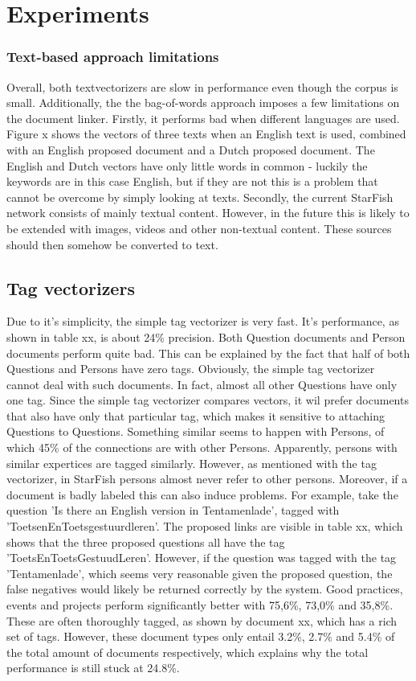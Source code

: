 \section{Experiments}
\subsubsection{Text-based approach limitations}
Overall, both textvectorizers are slow in performance even though the corpus is small. Additionally, the the bag-of-words approach imposes a few limitations on the document linker. Firstly, it performs bad when different languages are used. Figure x shows the vectors of three texts when an English text is used, combined with an English proposed document and a Dutch proposed document. The English and Dutch vectors have only little words in common - luckily the keywords are in this case English, but if they are not this is a problem that cannot be overcome by simply looking at texts. Secondly, the current StarFish network consists of mainly textual content. However, in the future this is likely to be extended with images, videos and other non-textual content. These sources should then somehow be converted to text.

\subsection{Tag vectorizers}

Due to it's simplicity, the simple tag vectorizer is very fast. It's performance, as shown in table xx, is about 24\% precision. Both Question documents and Person documents perform quite bad. This can be explained by the fact that half of both Questions and Persons have zero tags. Obviously, the simple tag vectorizer cannot deal with such documents. In fact, almost all other Questions have only one tag. Since the simple tag vectorizer compares vectors, it wil prefer documents that also have only that particular tag, which makes it sensitive to attaching Questions to Questions. Something similar seems to happen with Persons, of which 45\% of the connections are with other Persons. Apparently, persons with similar expertices are tagged similarly. However, as mentioned with the tag vectorizer, in StarFish persons almost never refer to other persons. Moreover, if a document is badly labeled this can also induce problems. For example, take the question 'Is there an English version in Tentamenlade', tagged with 'ToetsenEnToetsgestuurdleren'. The proposed links are visible in table xx, which shows that  the three proposed questions all have the tag 'ToetsEnToetsGestuudLeren'. However, if the question was tagged with the tag 'Tentamenlade', which seems very reasonable given the proposed question, the false negatives would likely be returned correctly by the system. Good practices, events and projects perform significantly better with 75,6\%, 73,0\% and 35,8\%. These are often thoroughly tagged, as shown by document xx, which has a rich set of tags. However, these document types only entail 3.2\%, 2.7\% and 5.4\% of the total amount of documents respectively, which explains why the total performance is still stuck at 24.8\%. 

